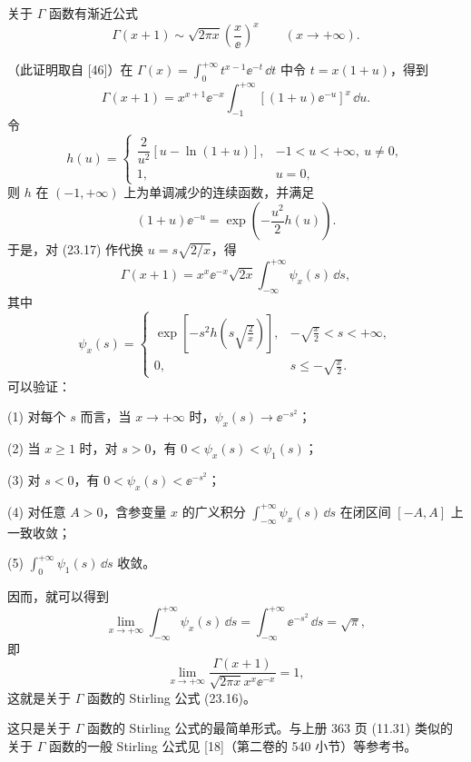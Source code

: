 \begin{xproposition}
关于 $\Gamma$ 函数有渐近公式
\begin{equation}
  \Gamma(x+1)\sim\sqrt{2\pi x}\left(\frac x\ee\right)^x\qquad(x\to+\infty).
  \tag{23.16}
\end{equation}
\end{xproposition}
\begin{xproof}
（此证明取自 [46]）在 $\Gamma(x)=\displaystyle\int_0^{+\infty}t^{x-1}\ee^{-t}\,\dd t$ 中令 $t=x(1+u)$，得到
\begin{equation}
  \Gamma(x+1)=x^{x+1}\ee^{-x}\int_{-1}^{+\infty}[(1+u)\ee^{-u}]^x\,\dd u.
  \tag{23.17}
\end{equation}
令
\[
  h(u)=
  \begin{cases}
    \dfrac2{u^2}[u-\ln(1+u)],&-1<u<+\infty,\ u\neq0,\\
    1,&u=0,
  \end{cases}
\]
则 $h$ 在 $(-1,+\infty)$ 上为单调减少的连续函数，并满足
\[
  (1+u)\ee^{-u}=\exp\left(-\frac{u^2}{2}h(u)\right).
\]
于是，对 (23.17) 作代换 $u=s\sqrt{2/x}$，得
\[
  \Gamma(x+1)=x^x\ee^{-x}\sqrt{2x}\int_{-\infty}^{+\infty}\psi_x(s)\,\dd s,
\]
其中
\[
  \psi_x(s)=
  \begin{cases}
    \exp\left[-s^2h\left(s\sqrt{\frac2x}\right)\right],&-\sqrt{\frac x2}<s<+\infty,\\
    0,&s\leqslant-\sqrt{\frac x2}.
  \end{cases}
\]
可以验证：

(1) 对每个 $s$ 而言，当 $x\to+\infty$ 时，$\psi_x(s)\to\ee^{-s^2}$；

(2) 当 $x\geqslant1$ 时，对 $s>0$，有 $0<\psi_x(s)<\psi_1(s)$；

(3) 对 $s<0$，有 $0<\psi_x(s)<\ee^{-s^2}$；

(4) 对任意 $A>0$，含参变量 $x$ 的广义积分 $\displaystyle\int_{-\infty}^{+\infty}\psi_x(s)\,\dd s$ 在闭区间 $[-A,A]$ 上一致收敛；

(5) $\displaystyle\int_0^{+\infty}\psi_1(s)\,\dd s$ 收敛。

因而，就可以得到
\[
  \lim_{x\to+\infty}\int_{-\infty}^{+\infty}\psi_x(s)\,\dd s
  =\int_{-\infty}^{+\infty}\ee^{-s^2}\,\dd s=\sqrt\pi,
\]
即
\[
  \lim_{x\to+\infty}\frac{\Gamma(x+1)}{\sqrt{2\pi x}x^x\ee^{-x}}=1,
\]
这就是关于 $\Gamma$ 函数的 Stirling 公式 (23.16)。
\end{xproof}

\begin{xremark}
这只是关于 $\Gamma$ 函数的 Stirling 公式的最简单形式。与上册 363 页 (11.31) 类似的关于 $\Gamma$ 函数的一般 Stirling 公式见 [18]（第二卷的 540 小节）等参考书。
\end{xremark}

